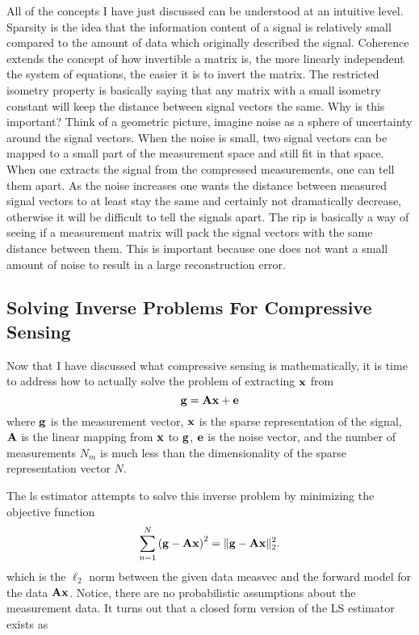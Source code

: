 All of the concepts I have just discussed can be understood at an intuitive level. Sparsity is the idea that the information content of a signal is relatively small compared to the amount of data which originally described the signal. Coherence extends the concept of how invertible a matrix is, the more linearly independent the system of equations, the easier it is to invert the matrix. The restricted isometry property is basically saying that any matrix with a small isometry constant will keep the distance between signal vectors the same. Why is this important? Think of a geometric picture, imagine noise as a sphere of uncertainty around the signal vectors. When the noise is small, two signal vectors can be mapped to a small part of the measurement space and still fit in that space. When one extracts the signal from the compressed measurements, one can tell them apart. As the noise increases one wants the distance between measured signal vectors to at least stay the same and certainly not dramatically decrease, otherwise it will be difficult to tell the signals apart. The \gls{rip} is basically a way of seeing if a measurement matrix will pack the signal vectors with the same distance between them. This is important because one does not want a small amount of noise to result in a large reconstruction error. 

\subsection{Solving Inverse Problems For Compressive Sensing}

Now that I have discussed what compressive sensing is mathematically, it is time to address how to actually solve the problem of extracting $\displaystyle \mathbf{x}$ from
\begin{equation}
	\displaystyle \mathbf{g} = \displaystyle \mathbf{Ax} + \displaystyle \mathbf{e}
	\label{eq:gTan}
\end{equation}
where $\displaystyle \mathbf{g}$ is the measurement vector, $\displaystyle \mathbf{x}$ is the sparse representation of the signal, $\displaystyle \mathbf{A}$ is the linear mapping from $\displaystyle \mathbf{x}$ to $\displaystyle \mathbf{g}$, $\displaystyle \mathbf{e}$ is the noise vector, and the number of measurements $N_m$ is much less than the dimensionality of the sparse representation vector $N$. 


The \gls{ls} estimator attempts to solve this inverse problem by minimizing the objective function 
\begin{equation}
	\sum_{n=1}^{N} \left( \displaystyle \mathbf{g} - \displaystyle \mathbf{A}\displaystyle \mathbf{x} \right)^2 = \| \displaystyle \mathbf{g} - \displaystyle \mathbf{A}\displaystyle \mathbf{x} \|_{2}^{2}.
	\label{eq:lsObjFunc}
\end{equation}
which is the $\ell_2$ norm between the given data \gls{measvec} and the forward model for the data $\displaystyle \mathbf{A}\displaystyle \mathbf{x}$. Notice, there are no probabilistic assumptions about the measurement data. It turns out that a closed form version of the LS estimator exists as

